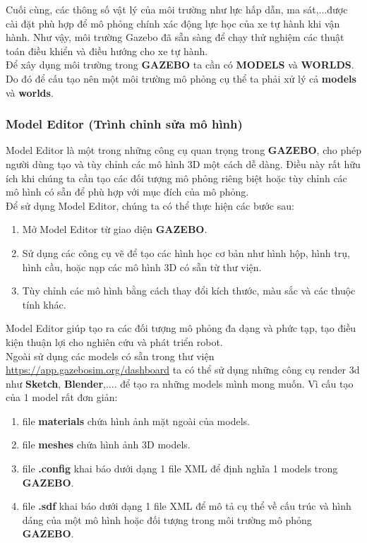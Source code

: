 \noindent Cuối cùng, các thông số vật lý của môi trường như lực hấp dẫn, ma sát,...được cài đặt phù hợp để mô phỏng chính xác động lực học của xe tự hành khi vận hành. Như vậy, môi trường Gazebo đã sẵn sàng để chạy thử nghiệm các thuật toán điều khiển và điều hướng cho xe tự hành.\\

\noindent Để xây dụng môi trường trong \textbf{GAZEBO} ta cần có \textbf{MODELS} và \textbf{WORLDS}. Do đó để cấu tạo nên một môi trường mô phỏng cụ thể ta phải xử lý cả \textbf{models} và \textbf{worlds}.\\
\subsubsection{Model Editor (Trình chỉnh sửa mô hình)}

Model Editor là một trong những công cụ quan trọng trong \textbf{GAZEBO}, cho phép người dùng tạo và tùy chỉnh các mô hình 3D một cách dễ dàng. Điều này rất hữu ích khi chúng ta cần tạo các đối tượng mô phỏng riêng biệt hoặc tùy chỉnh các mô hình có sẵn để phù hợp với mục đích của mô phỏng.\\

Để sử dụng Model Editor, chúng ta có thể thực hiện các bước sau:

\begin{enumerate}
    \item Mở Model Editor từ giao diện \textbf{GAZEBO}.
    \item Sử dụng các công cụ vẽ để tạo các hình học cơ bản như hình hộp, hình trụ, hình cầu, hoặc nạp các mô hình 3D có sẵn từ thư viện.
    \item Tùy chỉnh các mô hình bằng cách thay đổi kích thước, màu sắc và các thuộc tính khác.
\end{enumerate}

\noindent Model Editor giúp tạo ra các đối tượng mô phỏng đa dạng và phức tạp, tạo điều kiện thuận lợi cho nghiên cứu và phát triển robot.\\

\noindent Ngoài sử dụng các models có sẵn trong thư viện 
\url{https://app.gazebosim.org/dashboard} ta có thể sử dụng những công cụ render 3d như \textbf{Sketch}, \textbf{Blender},.... để tạo ra những models mình mong muốn. Vì cấu tạo của 1 model rất đơn giản:
\begin{enumerate}
    \item file \textbf{materials} chứa hình ảnh mặt ngoài của models.
    \item file \textbf{meshes} chứa hình ảnh 3D models.
    \item file \textbf{.config } khai báo dưới dạng 1 file XML để định nghĩa 1 models trong \textbf{GAZEBO}.
    \item file \textbf{.sdf } khai báo dưới dạng 1 file XML để  mô tả cụ thể về cấu trúc và hình dáng của một mô hình hoặc đối tượng trong môi trường mô phỏng \textbf{GAZEBO}.
\end{enumerate}


